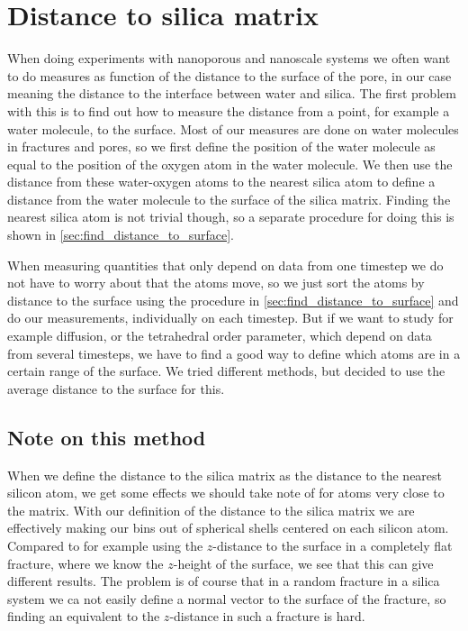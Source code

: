 \section{Distance to silica matrix\label{sec:measuring_distance_to_matrix}}
%
When doing experiments with nanoporous and nanoscale systems we often want to do measures as function of the distance to the surface of the pore, in our case meaning the distance to the interface between water and silica. The first problem with this is to find out how to measure the distance from a point, for example a water molecule, to the surface. Most of our measures are done on water molecules in fractures and pores, so we first define the position of the water molecule as equal to the position of the oxygen atom in the water molecule. We then use the distance from these water-oxygen atoms to the nearest silica atom to define a distance from the water molecule to the surface of the silica matrix. Finding the nearest silica atom is not trivial though, so a separate procedure for doing this is shown in \cref{sec:find_distance_to_surface}.

When measuring quantities that only depend on data from one timestep we do not have to worry about that the atoms move, so we just sort the atoms by distance to the surface using the procedure in \cref{sec:find_distance_to_surface} and do our measurements, individually on each timestep. But if we want to study for example diffusion, or the tetrahedral order parameter, which depend on data from several timesteps, we have to find a good way to define which atoms are in a certain range of the surface. We tried different methods, but decided to use the average distance to the surface for this.

\subsection{Note on this method\label{sec:distance_to_matrix_issues}}
%
When we define the distance to the silica matrix as the distance to the nearest silicon atom, we get some effects we should take note of for atoms very close to the matrix. With our definition of the distance to the silica matrix we are effectively making our bins out of spherical shells centered on each silicon atom. Compared to for example using the $z$-distance to the surface in a completely flat fracture, where we know the $z$-height of the surface, we see that this can give different results. The problem is of course that in a random fracture in a silica system we ca not easily define a normal vector to the surface of the fracture, so finding an equivalent to the $z$-distance in such a fracture is hard.

